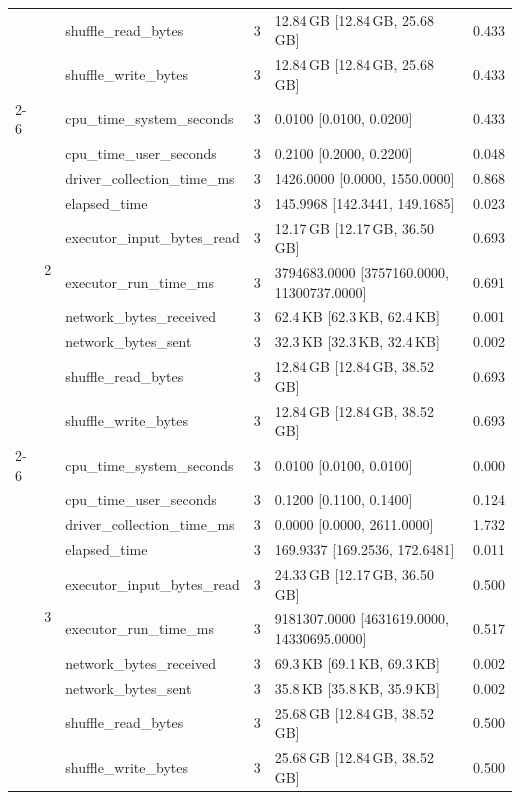 \begin{tabular}{lllrll}
 &  & shuffle_read_bytes & 3 & 12.84\,GB [12.84\,GB, 25.68\,GB] & 0.433 \\
 &  & shuffle_write_bytes & 3 & 12.84\,GB [12.84\,GB, 25.68\,GB] & 0.433 \\
\cline{2-6}
 & \multirow[t]{10}{*}{2} & cpu_time_system_seconds & 3 & 0.0100 [0.0100, 0.0200] & 0.433 \\
 &  & cpu_time_user_seconds & 3 & 0.2100 [0.2000, 0.2200] & 0.048 \\
 &  & driver_collection_time_ms & 3 & 1426.0000 [0.0000, 1550.0000] & 0.868 \\
 &  & elapsed_time & 3 & 145.9968 [142.3441, 149.1685] & 0.023 \\
 &  & executor_input_bytes_read & 3 & 12.17\,GB [12.17\,GB, 36.50\,GB] & 0.693 \\
 &  & executor_run_time_ms & 3 & 3794683.0000 [3757160.0000, 11300737.0000] & 0.691 \\
 &  & network_bytes_received & 3 & 62.4\,KB [62.3\,KB, 62.4\,KB] & 0.001 \\
 &  & network_bytes_sent & 3 & 32.3\,KB [32.3\,KB, 32.4\,KB] & 0.002 \\
 &  & shuffle_read_bytes & 3 & 12.84\,GB [12.84\,GB, 38.52\,GB] & 0.693 \\
 &  & shuffle_write_bytes & 3 & 12.84\,GB [12.84\,GB, 38.52\,GB] & 0.693 \\
\cline{2-6}
 & \multirow[t]{10}{*}{3} & cpu_time_system_seconds & 3 & 0.0100 [0.0100, 0.0100] & 0.000 \\
 &  & cpu_time_user_seconds & 3 & 0.1200 [0.1100, 0.1400] & 0.124 \\
 &  & driver_collection_time_ms & 3 & 0.0000 [0.0000, 2611.0000] & 1.732 \\
 &  & elapsed_time & 3 & 169.9337 [169.2536, 172.6481] & 0.011 \\
 &  & executor_input_bytes_read & 3 & 24.33\,GB [12.17\,GB, 36.50\,GB] & 0.500 \\
 &  & executor_run_time_ms & 3 & 9181307.0000 [4631619.0000, 14330695.0000] & 0.517 \\
 &  & network_bytes_received & 3 & 69.3\,KB [69.1\,KB, 69.3\,KB] & 0.002 \\
 &  & network_bytes_sent & 3 & 35.8\,KB [35.8\,KB, 35.9\,KB] & 0.002 \\
 &  & shuffle_read_bytes & 3 & 25.68\,GB [12.84\,GB, 38.52\,GB] & 0.500 \\
 &  & shuffle_write_bytes & 3 & 25.68\,GB [12.84\,GB, 38.52\,GB] & 0.500 \\

\end{tabular}
